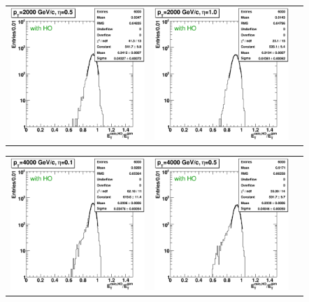 \documentclass{cmspaper}
\begin{document}
\begin{appendices}
\begin{center}
\begin{tabular}{lll}
 \includegraphics[width=2in]{figs/h_ETRatioWithHO_ET_py_fit_corr_eta0.5_pT2000.eps} &
 \includegraphics[width=2in]{figs/h_ETRatioWithHO_ET_py_fit_corr_eta1.0_pT2000.eps} \\
\end{tabular}
\end{center}
\begin{center}
\begin{tabular}{lll}
 \includegraphics[width=2in]{figs/h_ETRatioWithHO_ET_py_fit_corr_eta0.1_pT4000.eps} &
 \includegraphics[width=2in]{figs/h_ETRatioWithHO_ET_py_fit_corr_eta0.5_pT4000.eps} &

\end{tabular}
\end{center}
\end{appendices}
\end{document}

